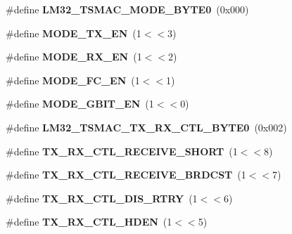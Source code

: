 \begin{DoxyCompactItemize}
\mbox{\label{group__lm32__tsmac_ga2f5ac34c96f7a9dcb2eff5279c611bf5}} 
\#define {\bfseries L\+M32\+\_\+\+T\+S\+M\+A\+C\+\_\+\+M\+O\+D\+E\+\_\+\+B\+Y\+T\+E0}~(0x000)
\item 
\mbox{\label{group__lm32__tsmac_ga1cfc8da147ac496dda61c137eb79c787}} 
\#define {\bfseries M\+O\+D\+E\+\_\+\+T\+X\+\_\+\+EN}~(1$<$$<$3)
\item 
\mbox{\label{group__lm32__tsmac_gab826e94ab30016191dd960f3ef82af3f}} 
\#define {\bfseries M\+O\+D\+E\+\_\+\+R\+X\+\_\+\+EN}~(1$<$$<$2)
\item 
\mbox{\label{group__lm32__tsmac_ga71fbfb169f9be5125210447b75b5d0b1}} 
\#define {\bfseries M\+O\+D\+E\+\_\+\+F\+C\+\_\+\+EN}~(1$<$$<$1)
\item 
\mbox{\label{group__lm32__tsmac_ga6a8d5290e8d8d35880f67ba0a82d8dc4}} 
\#define {\bfseries M\+O\+D\+E\+\_\+\+G\+B\+I\+T\+\_\+\+EN}~(1$<$$<$0)
\item 
\mbox{\label{group__lm32__tsmac_ga33831a1cb7ede7fd309328225e7e1172}} 
\#define {\bfseries L\+M32\+\_\+\+T\+S\+M\+A\+C\+\_\+\+T\+X\+\_\+\+R\+X\+\_\+\+C\+T\+L\+\_\+\+B\+Y\+T\+E0}~(0x002)
\item 
\mbox{\label{group__lm32__tsmac_ga1249e585414c9d94979c8948534d4e75}} 
\#define {\bfseries T\+X\+\_\+\+R\+X\+\_\+\+C\+T\+L\+\_\+\+R\+E\+C\+E\+I\+V\+E\+\_\+\+S\+H\+O\+RT}~(1$<$$<$8)
\item 
\mbox{\label{group__lm32__tsmac_ga4ed748e4276dd973f773ac6d731a6ab4}} 
\#define {\bfseries T\+X\+\_\+\+R\+X\+\_\+\+C\+T\+L\+\_\+\+R\+E\+C\+E\+I\+V\+E\+\_\+\+B\+R\+D\+C\+ST}~(1$<$$<$7)
\item 
\mbox{\label{group__lm32__tsmac_gab660884db33c68e2d7802a6b557aa11c}} 
\#define {\bfseries T\+X\+\_\+\+R\+X\+\_\+\+C\+T\+L\+\_\+\+D\+I\+S\+\_\+\+R\+T\+RY}~(1$<$$<$6)
\item 
\mbox{\label{group__lm32__tsmac_ga69c81054888802666fb7fe9007716463}} 
\#define {\bfseries T\+X\+\_\+\+R\+X\+\_\+\+C\+T\+L\+\_\+\+H\+D\+EN}~(1$<$$<$5)

\end{DoxyCompactItemize}
